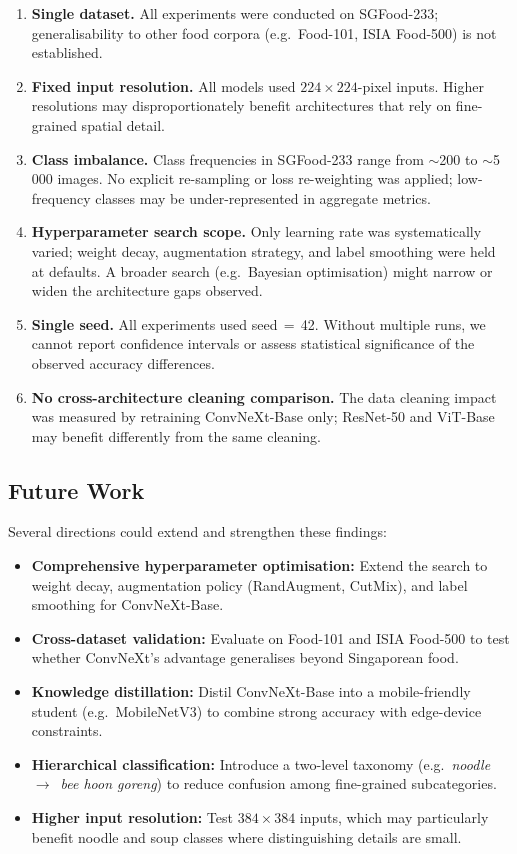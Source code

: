 \begin{enumerate}
  \item \textbf{Single dataset.}  All experiments were conducted on
    SGFood-233; generalisability to other food corpora (e.g.\ Food-101,
    ISIA Food-500) is not established.
  \item \textbf{Fixed input resolution.}  All models used
    $224{\times}224$-pixel inputs.  Higher resolutions may
    disproportionately benefit architectures that rely on fine-grained
    spatial detail.
  \item \textbf{Class imbalance.}  Class frequencies in SGFood-233
    range from $\sim$200 to $\sim$5\,000 images.  No explicit
    re-sampling or loss re-weighting was applied; low-frequency classes
    may be under-represented in aggregate metrics.
  \item \textbf{Hyperparameter search scope.}  Only learning rate was
    systematically varied; weight decay, augmentation strategy, and
    label smoothing were held at defaults.  A broader search
    (e.g.\ Bayesian optimisation) might narrow or widen the
    architecture gaps observed.
  \item \textbf{Single seed.}  All experiments used seed$\,{=}\,$42.
    Without multiple runs, we cannot report confidence intervals or
    assess statistical significance of the observed accuracy
    differences.
  \item \textbf{No cross-architecture cleaning comparison.}  The data
    cleaning impact was measured by retraining ConvNeXt-Base only;
    ResNet-50 and ViT-Base may benefit differently from the same
    cleaning.
\end{enumerate}

\subsection{Future Work}\label{sec:future-work}

Several directions could extend and strengthen these findings:

\begin{itemize}
  \item \textbf{Comprehensive hyperparameter optimisation:}  Extend the
    search to weight decay, augmentation policy (RandAugment, CutMix),
    and label smoothing for ConvNeXt-Base.
  \item \textbf{Cross-dataset validation:}  Evaluate on Food-101 and
    ISIA Food-500 to test whether ConvNeXt's advantage generalises
    beyond Singaporean food.
  \item \textbf{Knowledge distillation:}  Distil ConvNeXt-Base into a
    mobile-friendly student (e.g.\ MobileNetV3) to combine strong
    accuracy with edge-device constraints.
  \item \textbf{Hierarchical classification:}  Introduce a two-level
    taxonomy (e.g.\ \emph{noodle}~$\to$~\emph{bee hoon goreng}) to
    reduce confusion among fine-grained subcategories.
  \item \textbf{Higher input resolution:}  Test $384{\times}384$ inputs,
    which may particularly benefit noodle and soup classes where
    distinguishing details are small.
\end{itemize}


